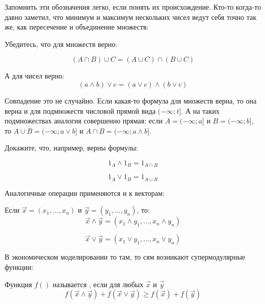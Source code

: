 Запомнить эти обозначения легко, если понять их происхождение. Кто-то когда-то давно заметил, что минимум и максимум нескольких чисел ведут себя точно так же, как пересечение и объединение множеств:

Убедитесь, что для множеств верно:

\begin{equation}
(A \cap B)\cup C=(A\cup C)\cap (B\cup C)
\end{equation}

А для чисел верно:
\begin{equation}
(a \wedge b)\vee c=(a\vee c)\wedge (b\vee c)
\end{equation}

Совпадение это не случайно. Если какая-то формула для множеств верна, то она верна и для подмножеств числовой прямой вида $ (-\infty;t] $. А на таких подмножествах аналогия совершенно прямая: если $ A=(-\infty;a] $ и $ B=(-\infty;b] $, то $ A\cup B= (-\infty;a\vee b] $ и $ A\cap B=(-\infty;a\wedge b] $.

Докажите, что, например, верны формулы:

\begin{equation}
1_{A}\wedge 1_{B}=1_{A\cap B}
\end{equation}

\begin{equation}
1_{A}\vee 1_{B}=1_{A\cup B}
\end{equation}



Аналогичные операции применяются и к векторам:

\begin{mydef} Если $ \vec{x}=(x_{1},\ldots, x_{n}) $ и $ \vec{y}=(y_{1},\ldots, y_{n}) $, то:
\begin{equation}
\vec{x}\wedge\vec{y}=(x_{1}\wedge y_{1}, \ldots, x_{n}\wedge y_{n})
\end{equation}

\begin{equation}
\vec{x}\vee\vec{y}=(x_{1}\vee y_{1}, \ldots, x_{n}\vee y_{n})
\end{equation}

\end{mydef}


В экономическом моделировании то там, то сям возникают супермодулярные функции:

\begin{mydef} Функция $ f() $ называется , если для любых $ \vec{x} $ и $ \vec{y} $
\begin{equation}
f(\vec{x}\wedge\vec{y})+f(\vec{x}\vee\vec{y})\geq f(\vec{x})+f(\vec{y})
\end{equation}

\end{mydef}

